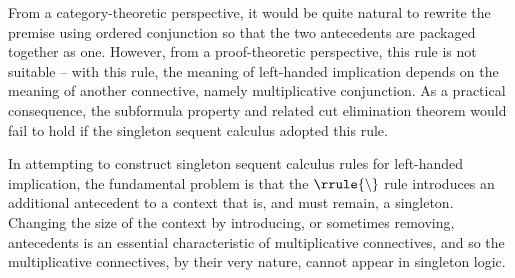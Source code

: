 From a category-theoretic perspective, it would be quite natural to rewrite the premise using ordered conjunction so that the two antecedents are packaged together as one.
% 
However, from a proof-theoretic perspective, this rule is not suitable -- with this rule, the meaning of left-handed implication depends on the meaning of another connective, namely multiplicative conjunction.
As a practical consequence, the subformula property and related cut elimination theorem would fail to hold if the singleton sequent calculus adopted this rule.

In attempting to construct singleton sequent calculus rules for left-handed implication, the fundamental problem is that the $\rrule{\limp}$ rule introduces an additional antecedent to a context that is, and must remain, a singleton.
Changing the size of the context by introducing, or sometimes removing, antecedents is an essential characteristic of multiplicative connectives, and so the multiplicative connectives, by their very nature, cannot appear in singleton logic.










